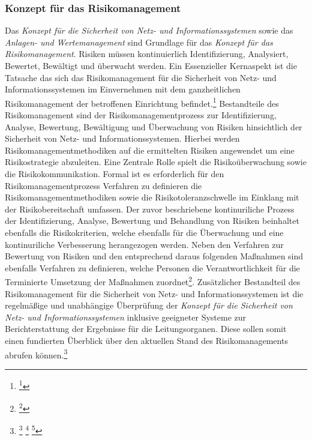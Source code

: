 \documentclass[11pt,a4paper,hidelinks]{article}   %
\begin{document}
            \subsubsection{Konzept für das Risikomanagement}
            Das \emph{Konzept für die Sicherheit von Netz- und Informationssystemen} sowie das \emph{Anlagen- und Wertemanagement} sind Grundlage für das \emph{Konzept für das Risikomanagement}. Risiken müssen kontinuierlich Identifizierung, Analysiert, Bewertet, Bewältigt und überwacht werden. Ein Essenzieller Kernaspekt ist die Tatsache das sich das Risikomanagement für die Sicherheit von Netz- und Informationssystemen im Einvernehmen mit dem ganzheitlichen Risikomanagement der betroffenen Einrichtung befindet.\footnote{\footcite[Vgl.][, Anhang, Nummer 2.1.1.]{EU2024-2690}} Bestandteile des Risikomanagement sind der Risikomanagementprozess zur Identifizierung, Analyse, Bewertung, Bewältigung und Überwachung von Risiken hinsichtlich der Sicherheit von Netz- und Informationssystemen. Hierbei werden Risikomanagementmethodiken auf die ermittelten Risiken angewendet um eine Risikostrategie abzuleiten. Eine Zentrale Rolle spielt die Risikoüberwachung sowie die Risikokommunikation. Formal ist es erforderlich für den Risikomanagementprozess Verfahren zu definieren die Risikomanagementmethodiken sowie die Risikotoleranzschwelle im Einklang mit der Risikobereitschaft umfassen. Der zuvor beschriebene kontinuriliche Prozess der Identifizierung, Analyse, Bewertung und Behandlung von Risiken beinhaltet ebenfalls die Risikokriterien, welche ebenfalls für die Überwachung und eine kontinuriliche Verbesserung herangezogen werden. Neben den Verfahren zur Bewertung von Risiken und den entsprechend daraus folgenden Maßnahmen sind ebenfalls Verfahren zu definieren, welche Personen die Verantwortlichkeit für die Terminierte Umsetzung der Maßnahmen zuordnet\footnote{\footcite[Vgl.][, Anhang, Nummer 2.1.2. \& 2.1.3.]{EU2024-2690}}. Zusätzlicher Bestandteil des Risikomanagement für die Sicherheit von Netz- und Informationssystemen ist die regelmäßige und unabhängige Überprüfung der \emph{Konzept für die Sicherheit von Netz- und Informationssystemen} inklusive geeigneter Systeme zur Berichterstattung der Ergebnisse für die Leitungsorganen. Diese sollen somit einen fundierten Überblick über den aktuellen Stand des Risikomanagements abrufen können.\footnote{
                \footcite[Vgl.][, Anhang, Nummer 2.2.1., 2.3.1. \& 2.3.2.]{EU2024-2690}
                \footcite[Vgl.][, S. 1]{iso31000-2018}
                \footcite[Vgl.][, §30 Absatz 1 \& Absatz 2, Nummer 1,]{NIS2UmsuCG}
            }
\end{document}
